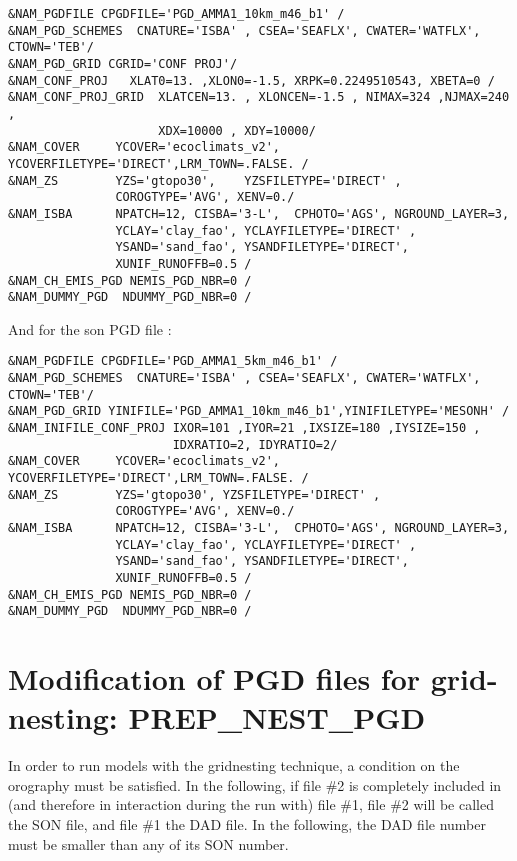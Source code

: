 \begin{verbatim}
&NAM_PGDFILE CPGDFILE='PGD_AMMA1_10km_m46_b1' /
&NAM_PGD_SCHEMES  CNATURE='ISBA' , CSEA='SEAFLX', CWATER='WATFLX', CTOWN='TEB'/
&NAM_PGD_GRID CGRID='CONF PROJ'/
&NAM_CONF_PROJ   XLAT0=13. ,XLON0=-1.5, XRPK=0.2249510543, XBETA=0 /
&NAM_CONF_PROJ_GRID  XLATCEN=13. , XLONCEN=-1.5 , NIMAX=324 ,NJMAX=240 ,
                     XDX=10000 , XDY=10000/
&NAM_COVER     YCOVER='ecoclimats_v2', YCOVERFILETYPE='DIRECT',LRM_TOWN=.FALSE. /
&NAM_ZS        YZS='gtopo30',    YZSFILETYPE='DIRECT' ,
               COROGTYPE='AVG', XENV=0./
&NAM_ISBA      NPATCH=12, CISBA='3-L',  CPHOTO='AGS', NGROUND_LAYER=3, 
               YCLAY='clay_fao', YCLAYFILETYPE='DIRECT' ,
               YSAND='sand_fao', YSANDFILETYPE='DIRECT',
               XUNIF_RUNOFFB=0.5 /
&NAM_CH_EMIS_PGD NEMIS_PGD_NBR=0 /               
&NAM_DUMMY_PGD  NDUMMY_PGD_NBR=0 /
\end{verbatim}

And for the son PGD file : 
\begin{verbatim}
&NAM_PGDFILE CPGDFILE='PGD_AMMA1_5km_m46_b1' /
&NAM_PGD_SCHEMES  CNATURE='ISBA' , CSEA='SEAFLX', CWATER='WATFLX', CTOWN='TEB'/
&NAM_PGD_GRID YINIFILE='PGD_AMMA1_10km_m46_b1',YINIFILETYPE='MESONH' /
&NAM_INIFILE_CONF_PROJ IXOR=101 ,IYOR=21 ,IXSIZE=180 ,IYSIZE=150 ,
                       IDXRATIO=2, IDYRATIO=2/
&NAM_COVER     YCOVER='ecoclimats_v2', YCOVERFILETYPE='DIRECT',LRM_TOWN=.FALSE. /
&NAM_ZS        YZS='gtopo30', YZSFILETYPE='DIRECT' ,
               COROGTYPE='AVG', XENV=0./
&NAM_ISBA      NPATCH=12, CISBA='3-L',  CPHOTO='AGS', NGROUND_LAYER=3, 
               YCLAY='clay_fao', YCLAYFILETYPE='DIRECT' ,
               YSAND='sand_fao', YSANDFILETYPE='DIRECT',
               XUNIF_RUNOFFB=0.5 /
&NAM_CH_EMIS_PGD NEMIS_PGD_NBR=0 /               
&NAM_DUMMY_PGD  NDUMMY_PGD_NBR=0 /
\end{verbatim}

\newpage
\section{Modification of PGD files for grid-nesting: {\bf
PREP\_NEST\_PGD}}

In order to run models with the gridnesting technique, a condition on
the orography must be satisfied. In the following, if file \#2 is completely
included in (and therefore in interaction during the run with) file \#1,
file \#2 will be called the SON file, and file \#1 the DAD file.
In the following, the DAD file number must be smaller than any of its SON number.

